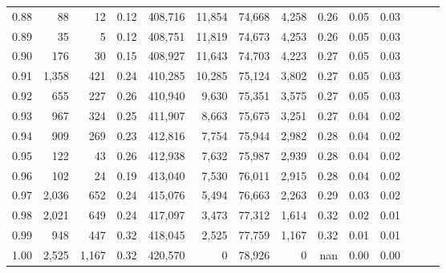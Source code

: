 \begin{tabular}{rrrrrrrrrrrrrr}
0.88 &      88 &     12 &  0.12 &  408,716 &   11,854 &  74,668 &   4,258 &  0.26 &  0.05 &      0.03 \\
0.89 &      35 &      5 &  0.12 &  408,751 &   11,819 &  74,673 &   4,253 &  0.26 &  0.05 &      0.03 \\
0.90 &     176 &     30 &  0.15 &  408,927 &   11,643 &  74,703 &   4,223 &  0.27 &  0.05 &      0.03 \\
0.91 &   1,358 &    421 &  0.24 &  410,285 &   10,285 &  75,124 &   3,802 &  0.27 &  0.05 &      0.03 \\
0.92 &     655 &    227 &  0.26 &  410,940 &    9,630 &  75,351 &   3,575 &  0.27 &  0.05 &      0.03 \\
0.93 &     967 &    324 &  0.25 &  411,907 &    8,663 &  75,675 &   3,251 &  0.27 &  0.04 &      0.02 \\
0.94 &     909 &    269 &  0.23 &  412,816 &    7,754 &  75,944 &   2,982 &  0.28 &  0.04 &      0.02 \\
0.95 &     122 &     43 &  0.26 &  412,938 &    7,632 &  75,987 &   2,939 &  0.28 &  0.04 &      0.02 \\
0.96 &     102 &     24 &  0.19 &  413,040 &    7,530 &  76,011 &   2,915 &  0.28 &  0.04 &      0.02 \\
0.97 &   2,036 &    652 &  0.24 &  415,076 &    5,494 &  76,663 &   2,263 &  0.29 &  0.03 &      0.02 \\
0.98 &   2,021 &    649 &  0.24 &  417,097 &    3,473 &  77,312 &   1,614 &  0.32 &  0.02 &      0.01 \\
0.99 &     948 &    447 &  0.32 &  418,045 &    2,525 &  77,759 &   1,167 &  0.32 &  0.01 &      0.01 \\
1.00 &   2,525 &  1,167 &  0.32 &  420,570 &        0 &  78,926 &       0 &   nan &  0.00 &      0.00 \\
\bottomrule
\end{tabular}
